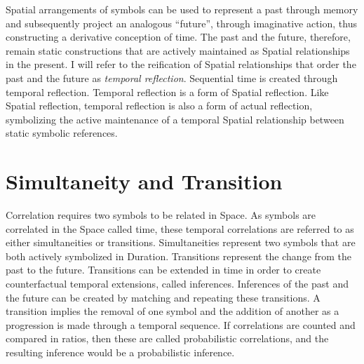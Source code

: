 Spatial arrangements of symbols can be used to represent a past
through memory and subsequently project an analogous ``future'',
through imaginative action, thus constructing a derivative conception
of time.  The past and the future, therefore, remain static
constructions that are actively maintained as Spatial relationships in
the present.  I will refer to the reification of Spatial relationships
that order the past and the future as \emph{temporal reflection}.
Sequential time is created through temporal reflection.  Temporal
reflection is a form of Spatial reflection.  Like Spatial reflection,
temporal reflection is also a form of actual reflection, symbolizing
the active maintenance of a temporal Spatial relationship between
static symbolic references.

\section{Simultaneity and Transition}

Correlation requires two symbols to be related in Space.  As symbols
are correlated in the Space called time, these temporal correlations
are referred to as either simultaneities or transitions.
Simultaneities represent two symbols that are both actively symbolized
in Duration.  Transitions represent the change from the past to the
future.  Transitions can be extended in time in order to create
counterfactual temporal extensions, called inferences.  Inferences of
the past and the future can be created by matching and repeating these
transitions.  A transition implies the removal of one symbol and the
addition of another as a progression is made through a temporal
sequence.  If correlations are counted and compared in ratios, then
these are called probabilistic correlations, and the resulting
inference would be a probabilistic inference.

